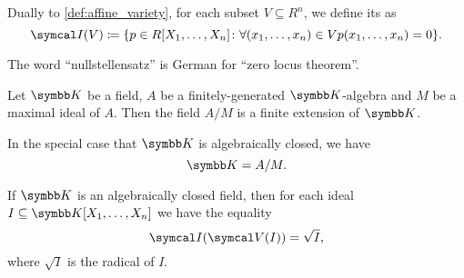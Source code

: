 \begin{definition}\label{def:ideal_of_affine_variety}\cite[70]{Kocev2016}
  Dually to \cref{def:affine_variety}, for each subset \( V \subseteq R^n \), we define its  as
  \begin{equation*}
    \Cal{I}(V) \coloneqq \{ p \in R[X_1, \ldots, X_n] \colon \forall (x_1, \ldots, x_n) \in V p(x_1, \ldots, x_n) = 0 \}.
  \end{equation*}
\end{definition}

\begin{remark}\label{remark:nullstelletsatz_etymology}
  The word \enquote{nullstellensatz} is German for \enquote{zero locus theorem}.
\end{remark}

\begin{theorem}\label{thm:algebraic_nullstellensatz}\cite[64]{Kocev2016}
  Let \( \K \) be a field, \( A \) be a finitely-generated \( \K \)-algebra and \( M \) be a maximal ideal of \( A \). Then the field \( A / M \) is a finite extension of \( \K \).

  In the special case that \( \K \) is algebraically closed, we have
  \begin{equation*}
    \K = A / M.
  \end{equation*}
\end{theorem}

\begin{theorem}\label{thm:geometric_nullstellensatz}\cite[70]{Kocev2016}
  If \( \K \) is an algebraically closed field, then for each ideal \( I \subseteq \K[X_1, \ldots, X_n] \) we have the equality
  \begin{equation*}
    \Cal{I}(\Cal{V}(I)) = \sqrt I,
  \end{equation*}
  where \( \sqrt I \) is the radical of \( I \).
\end{theorem}


